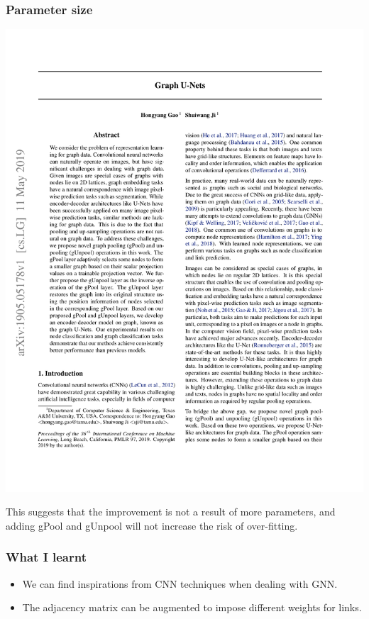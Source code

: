 \documentclass[12pt,aspectratio=169]{beamer}
\begin{document}
    \begin{frame}
        \frametitle{Parameter size}

        \begin{center}
            \includegraphics[page=8,trim=1cm 13cm 1cm 12cm,clip,scale=0.7]{Graph U-Net.pdf}
        \end{center}

        This suggests that the improvement is not a result of more parameters, and adding gPool and gUnpool will not
        increase the risk of over-fitting.
    \end{frame}

    \appendix

    \begin{frame}
        \frametitle{What I learnt}

        \begin{itemize}
            \setlength{\itemsep}{.8em}
            \item We can find inspirations from CNN techniques when dealing with GNN.
            \item The adjacency matrix can be augmented to impose different weights for links.
        \end{itemize}
    \end{frame}

\end{document}
